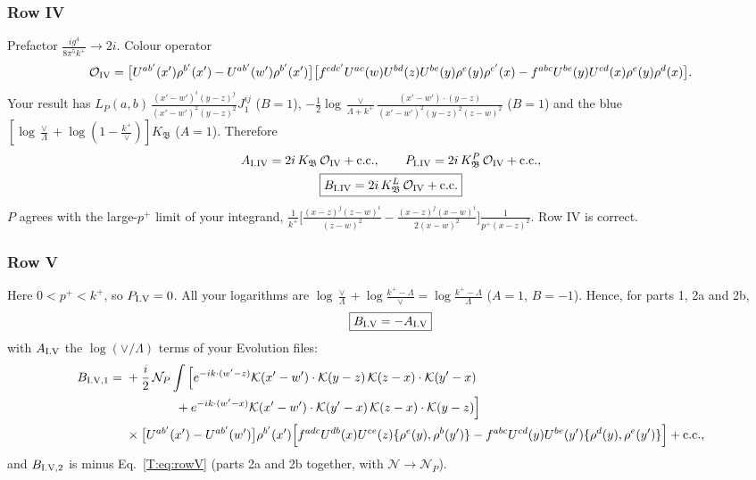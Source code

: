 \documentclass[10pt]{article}
\numberwithin{equation}{section}
\newcommand{\KK}{\mathcal K}
\newcommand{\NN}{\mathcal N}
\newcommand{\NP}{\mathcal N_{P}}
\newcommand{\kp}{k^+}
\newcommand{\pp}{p^+}
\begin{document}
\subsubsection{Row IV}
Prefactor $\frac{ig^4}{8\pi^5k^+}\to2i$. Colour operator
\[
\mathcal O_{\rm IV}=\big[U^{ab'}(x')\rho^{b'}(x')-U^{ab'}(w')\rho^{b'}(x')\big]\big[f^{cdc'}U^{ac}(w)U^{bd}(z)U^{be}(y)\rho^e(y)\rho^{c'}(x)-f^{abc}U^{be}(y)U^{cd}(x)\rho^e(y)\rho^d(x)\big].
\]
Your result has $L_P(a,b)\,\frac{(x'-w')^i(y-z)^j}{(x'-w')^2(y-z)^2}J_1^{ij}$ ($B=1$), $-\frac12\log\frac{\vee}{\Lambda+k^+}\frac{(x'-w')\cdot(y-z)}{(x'-w')^2(y-z)^2(z-w)^2}$ ($B=1$) and the blue $[\log\frac{\vee}{\Lambda}+\log(1-\frac{k^+}{\vee})]K_{\mathfrak B}$ ($A=1$). Therefore
\begin{gather}
A_{\rm I.IV}=2i\,K_{\mathfrak B}\,\mathcal O_{\rm IV}+{\rm c.c.},\qquad P_{\rm I.IV}=2i\,K^{P}_{\mathfrak B}\,\mathcal O_{\rm IV}+{\rm c.c.},\notag\\
\boxed{B_{\rm I.IV}=2i\,K^{L}_{\mathfrak B}\,\mathcal O_{\rm IV}+{\rm c.c.}}
\end{gather}
$P$ agrees with the large-$\pp$ limit of your integrand, $\frac{1}{k^+}\big[\frac{(x-z)^j(z-w)^i}{(z-w)^2}-\frac{(x-z)^j(x-w)^i}{2(x-w)^2}\big]\frac{1}{\pp(x-z)^2}$. Row IV is correct.

\subsubsection{Row V}
Here $0<\pp<\kp$, so $P_{\rm I.V}=0$. All your logarithms are $\log\frac{\vee}{\Lambda}+\log\frac{k^+-\Lambda}{\vee}=\log\frac{k^+-\Lambda}{\Lambda}$ ($A=1$, $B=-1$). Hence, for parts 1, 2a and 2b,
\begin{equation}
\boxed{B_{\rm I.V}=-A_{\rm I.V}}
\end{equation}
with $A_{\rm I.V}$ the $\log(\vee/\Lambda)$ terms of your Evolution files:
\begin{align}
B_{\rm I.V,1}={}&+\frac i2\,\NP\int\Big[e^{-ik\cdot(w'-z)}\KK(x'-w')\cdot\KK(y-z)\,\KK(z-x)\cdot\KK(y'-x)\notag\\
&\qquad\qquad+e^{-ik\cdot(w'-x)}\KK(x'-w')\cdot\KK(y'-x)\,\KK(z-x)\cdot\KK(y-z)\Big]\notag\\
&\times\big[U^{ab'}(x')-U^{ab'}(w')\big]\rho^{b'}(x')\Big[f^{adc}U^{db}(x)U^{ce}(z)\{\rho^e(y),\rho^b(y')\}-f^{abc}U^{cd}(y)U^{be}(y')\{\rho^d(y),\rho^e(y')\}\Big]+{\rm c.c.},
\end{align}
and $B_{\rm I.V,2}$ is minus Eq.~\eqref{T:eq:rowV} (parts 2a and 2b together, with $\NN\to\NP$).
\end{document}
